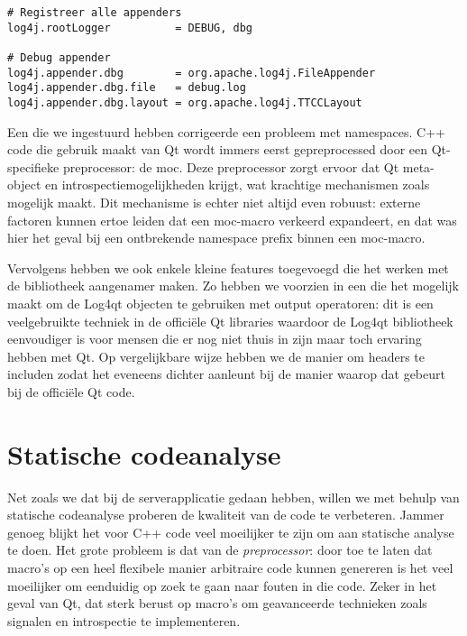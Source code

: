 \begin{lstlisting}[language=JavaProperties, float, caption=Externe configuratie van Log4qt., label=lst:log4qt]
# Registreer alle appenders
log4j.rootLogger          = DEBUG, dbg

# Debug appender
log4j.appender.dbg        = org.apache.log4j.FileAppender
log4j.appender.dbg.file   = debug.log
log4j.appender.dbg.layout = org.apache.log4j.TTCCLayout
\end{lstlisting}

Een  die we ingestuurd hebben corrigeerde een probleem met namespaces. C++ code die gebruik maakt van Qt wordt immers eerst gepreprocessed door een Qt-specifieke preprocessor: de \ac{moc}. Deze preprocessor zorgt ervoor dat Qt meta-object en introspectiemogelijkheden krijgt, wat krachtige mechanismen zoals  mogelijk maakt. Dit mechanisme is echter niet altijd even robuust: externe factoren kunnen ertoe leiden dat een \ac{moc}-macro verkeerd expandeert, en dat was hier het geval bij een ontbrekende namespace prefix binnen een  \ac{moc}-macro.

Vervolgens hebben we ook enkele kleine features toegevoegd die het werken met de bibliotheek aangenamer maken. Zo hebben we voorzien in een  die het mogelijk maakt om de Log4qt objecten te gebruiken met output operatoren: dit is een veelgebruikte techniek in de officiële Qt libraries waardoor de Log4qt bibliotheek eenvoudiger is voor mensen die er nog niet thuis in zijn maar toch ervaring hebben met Qt. Op vergelijkbare wijze hebben we de manier om headers te includen  zodat het eveneens dichter aanleunt bij de manier waarop dat gebeurt bij de officiële Qt code.

\section{Statische codeanalyse}
\label{kiosk:realisatie:codeanalyse}

Net zoals we dat bij de serverapplicatie gedaan hebben, willen we met behulp van statische codeanalyse proberen de kwaliteit van de code te verbeteren. Jammer genoeg blijkt het voor C++ code veel moeilijker te zijn om aan statische analyse te doen. Het grote probleem is dat van de \emph{preprocessor}: door toe te laten dat macro's op een heel flexibele manier arbitraire code kunnen genereren is het veel moeilijker om eenduidig op zoek te gaan naar fouten in die code. Zeker in het geval van Qt, dat sterk berust op macro's om geavanceerde technieken zoals signalen en introspectie te implementeren.

